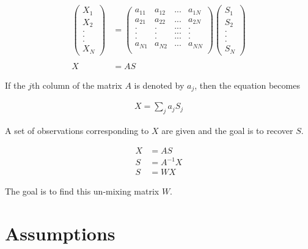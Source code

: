 \documentclass[11pt, a4paper]{article}
\begin{document}
\begin{align*}
	\begin{pmatrix} 
	X_1 \\ 
	X_2 \\ 
	. \\ 
	. \\ 
	. \\ 
	X_N 
	\end{pmatrix} &=
	\begin{pmatrix} 
	a_{11} & a_{12} & ... & a_{1N} \\ 
	a_{21} & a_{22} & ... & a_{2N} \\ 
	.      & .      & ... & .      \\
	.      & .      & ... & .      \\
	.      & .      & ... & .      \\ 
	a_{N1} & a_{N2} & ... & a_{NN} \\ 
	\end{pmatrix}
	\begin{pmatrix} 
	S_1 \\ 
	S_2 \\ 
	. \\ 
	. \\ 
	. \\ 
	S_N 
	\end{pmatrix} \\
	\\
	X &= A S
\end{align*}

If the $j$th column of the matrix $A$ is denoted by $a_j$, then the equation becomes

\begin{align*}
	X = \sum_j a_j S_j 
\end{align*}

A set of observations corresponding to $X$ are given and the goal is to recover $S$.

\begin{align*}
	X & = A S      \\
	S & = A^{-1} X \\
	S & = W X      
\end{align*}

The goal is to find this un-mixing matrix $W$.

\section{Assumptions}
\end{document}
